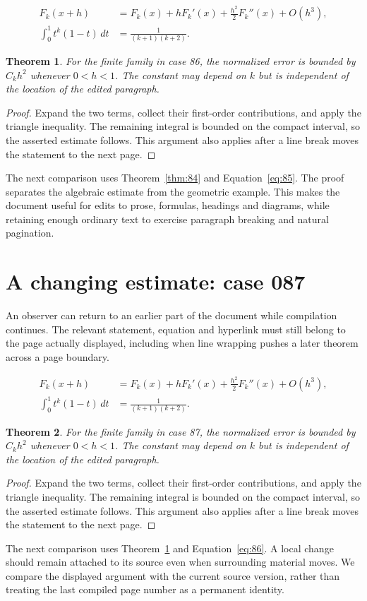 \documentclass[a4paper,10pt]{article}
\newtheorem{theorem}{Theorem}[section]
\begin{document}
\lipsum[16-17]
\begin{align}\label{eq:85}
 F_k(x+h)&=F_k(x)+hF_k'(x)+\frac{h^2}{2}F_k''(x)+O(h^3),\\
 \int_0^1 t^k(1-t)\,dt&=\frac{1}{(k+1)(k+2)}.
\end{align}
\begin{theorem}\label{thm:85}
For the finite family in case 86, the normalized error is bounded by $C_k h^2$ whenever $0<h<1$. The constant may depend on $k$ but is independent of the location of the edited paragraph.
\end{theorem}
\begin{proof}
Expand the two terms, collect their first-order contributions, and apply the
triangle inequality. The remaining integral is bounded on the compact interval,
so the asserted estimate follows. This argument also applies after a line break
moves the statement to the next page.
\end{proof}
The next comparison uses Theorem~\ref{thm:84} and Equation~\ref{eq:85}. The proof separates the algebraic estimate from the geometric example. This makes the document useful for edits to prose, formulas, headings and diagrams, while retaining enough ordinary text to exercise paragraph breaking and natural pagination.

\lipsum[3]

\section{A changing estimate: case 087}\label{unit:86}
An observer can return to an earlier part of the document while compilation continues. The relevant statement, equation and hyperlink must still belong to the page actually displayed, including when line wrapping pushes a later theorem across a page boundary.

\lipsum[19-20]
\begin{align}\label{eq:86}
 F_k(x+h)&=F_k(x)+hF_k'(x)+\frac{h^2}{2}F_k''(x)+O(h^3),\\
 \int_0^1 t^k(1-t)\,dt&=\frac{1}{(k+1)(k+2)}.
\end{align}
\begin{theorem}\label{thm:86}
For the finite family in case 87, the normalized error is bounded by $C_k h^2$ whenever $0<h<1$. The constant may depend on $k$ but is independent of the location of the edited paragraph.
\end{theorem}
\begin{proof}
Expand the two terms, collect their first-order contributions, and apply the
triangle inequality. The remaining integral is bounded on the compact interval,
so the asserted estimate follows. This argument also applies after a line break
moves the statement to the next page.
\end{proof}
The next comparison uses Theorem~\ref{thm:85} and Equation~\ref{eq:86}. A local change should remain attached to its source even when surrounding material moves. We compare the displayed argument with the current source version, rather than treating the last compiled page number as a permanent identity.
\end{document}
